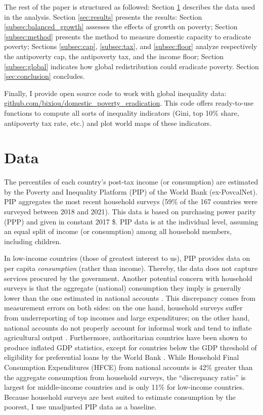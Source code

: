 \documentclass[12pt,english]{article}
\begin{document}
The rest of the paper is structured as followed: Section \ref{subsec:data} describes the data used in the analysis. Section \ref{sec:results} presents the results: Section \ref{subsec:balanced_growth} assesses the effects of growth on poverty; Section \ref{subsec:method} presents the method to measure domestic capacity to eradicate poverty; Sections \ref{subsec:cap}, \ref{subsec:tax}, and \ref{subsec:floor} analyze respectively the antipoverty cap, the antipoverty tax, and the income floor; Section \ref{subsec:global} indicates how global redistribution could eradicate poverty. Section \ref{sec:conclusion} concludes.

Finally, I provide open source code to work with global inequality data: \href{https://github.com/bixiou/domestic_poverty_eradication}{github.com/bixiou/domestic\_poverty\_eradication}. This code offers ready-to-use functions to compute all sorts of inequality indicators (Gini, top 10\% share, antipoverty tax rate, etc.) and plot world maps of these indicators.

\section{Data}\label{subsec:data}
The percentiles of each country's post-tax income (or consumption) are estimated by the Poverty and Inequality Platform (PIP) of the World Bank (ex-PovcalNet). PIP aggregates the most recent household surveys (59\% of the 167 countries were surveyed between 2018 and 2021). This data is based on purchasing power parity (PPP) and given in constant 2017 \$. PIP data is %
at the individual level, assuming an equal split of income (or consumption) among all household members, including children. %

In low-income countries (those of greatest interest to us), PIP provides data on per capita \textit{consumption} (rather than income). Thereby, the data does not capture services procured by the government. 
Another potential concern with household surveys is that the aggregate (national) consumption they imply is generally lower than the one estimated in national accounts \citep{deaton_measuring_2005,prydz_disparities_2022,hlasny_impact_2022}. This discrepancy comes from measurement errors on both sides: on the one hand, household surveys suffer from underreporting of top incomes and large expenditures; on the other hand, national accounts do not properly account for informal work %
and tend to inflate agricultural output \citep{angrist_why_2021}. 
Furthermore, authoritarian countries have been shown to produce inflated GDP statistics, except for countries below the GDP threshold of eligibility for preferential loans by the World Bank \citep{martinez_how_2022}. %
While Household Final Consumption Expenditures (HFCE) from national accounts is 42\% greater than the aggregate consumption from household surveys, the ``discrepancy ratio'' is largest for middle-income countries and is only 11\% for low-income countries. 
Because household surveys are best suited to estimate consumption by the poorest, I use unadjusted PIP data as a baseline. 
\end{document}
